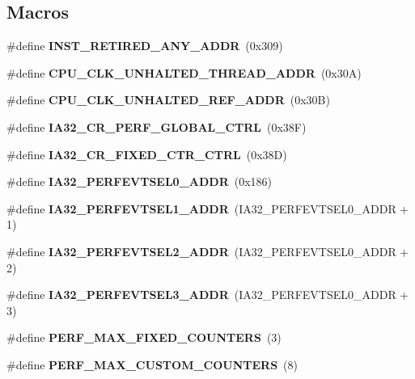 \subsection*{Macros}
\begin{DoxyCompactItemize}
\item 
\mbox{\label{types_8h_abee4b00b55da6bf6f0f037b1b397be92}} 
\#define {\bfseries I\+N\+S\+T\+\_\+\+R\+E\+T\+I\+R\+E\+D\+\_\+\+A\+N\+Y\+\_\+\+A\+D\+DR}~(0x309)
\item 
\mbox{\label{types_8h_a065c692e17728e02e4182e721991ecf1}} 
\#define {\bfseries C\+P\+U\+\_\+\+C\+L\+K\+\_\+\+U\+N\+H\+A\+L\+T\+E\+D\+\_\+\+T\+H\+R\+E\+A\+D\+\_\+\+A\+D\+DR}~(0x30\+A)
\item 
\mbox{\label{types_8h_a0e8b3248880f64b712ada0ae6cd8057e}} 
\#define {\bfseries C\+P\+U\+\_\+\+C\+L\+K\+\_\+\+U\+N\+H\+A\+L\+T\+E\+D\+\_\+\+R\+E\+F\+\_\+\+A\+D\+DR}~(0x30\+B)
\item 
\mbox{\label{types_8h_af75f65880118628dac6b97221eea5f65}} 
\#define {\bfseries I\+A32\+\_\+\+C\+R\+\_\+\+P\+E\+R\+F\+\_\+\+G\+L\+O\+B\+A\+L\+\_\+\+C\+T\+RL}~(0x38\+F)
\item 
\mbox{\label{types_8h_abd4597ec09d6e135869d4e5e40b4bcb9}} 
\#define {\bfseries I\+A32\+\_\+\+C\+R\+\_\+\+F\+I\+X\+E\+D\+\_\+\+C\+T\+R\+\_\+\+C\+T\+RL}~(0x38\+D)
\item 
\mbox{\label{types_8h_a259b1657dd97a573ac9f265a121e5413}} 
\#define {\bfseries I\+A32\+\_\+\+P\+E\+R\+F\+E\+V\+T\+S\+E\+L0\+\_\+\+A\+D\+DR}~(0x186)
\item 
\mbox{\label{types_8h_abc4be06ea51529572906dfa1a503b9ec}} 
\#define {\bfseries I\+A32\+\_\+\+P\+E\+R\+F\+E\+V\+T\+S\+E\+L1\+\_\+\+A\+D\+DR}~(I\+A32\+\_\+\+P\+E\+R\+F\+E\+V\+T\+S\+E\+L0\+\_\+\+A\+D\+DR + 1)
\item 
\mbox{\label{types_8h_a387524f9b226cefe58103a990334e420}} 
\#define {\bfseries I\+A32\+\_\+\+P\+E\+R\+F\+E\+V\+T\+S\+E\+L2\+\_\+\+A\+D\+DR}~(I\+A32\+\_\+\+P\+E\+R\+F\+E\+V\+T\+S\+E\+L0\+\_\+\+A\+D\+DR + 2)
\item 
\mbox{\label{types_8h_ab4670da4066d99e7761424091bb398ec}} 
\#define {\bfseries I\+A32\+\_\+\+P\+E\+R\+F\+E\+V\+T\+S\+E\+L3\+\_\+\+A\+D\+DR}~(I\+A32\+\_\+\+P\+E\+R\+F\+E\+V\+T\+S\+E\+L0\+\_\+\+A\+D\+DR + 3)
\item 
\mbox{\label{types_8h_ad8b156733170cb73fb79d5c53e4d1f3f}} 
\#define {\bfseries P\+E\+R\+F\+\_\+\+M\+A\+X\+\_\+\+F\+I\+X\+E\+D\+\_\+\+C\+O\+U\+N\+T\+E\+RS}~(3)
\item 
\mbox{\label{types_8h_a5be6d99cee99aaa068978bf59281bffb}} 
\#define {\bfseries P\+E\+R\+F\+\_\+\+M\+A\+X\+\_\+\+C\+U\+S\+T\+O\+M\+\_\+\+C\+O\+U\+N\+T\+E\+RS}~(8)

\end{DoxyCompactItemize}
